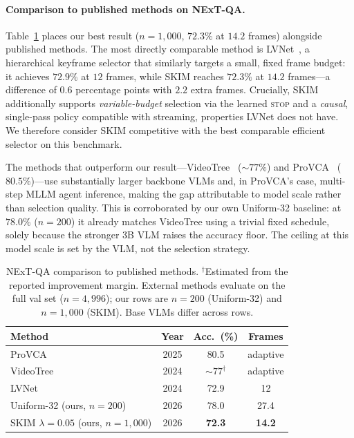 \documentclass{article}
\begin{document}
\paragraph{Comparison to published methods on NExT-QA.}
Table~\ref{tab:sota} places our best result ($n{=}1{,}000$, $72.3\%$ at $14.2$ frames)
alongside published methods. The most directly comparable method is
LVNet~\citep{lvnet}, a hierarchical keyframe selector that similarly targets a small,
fixed frame budget: it achieves $72.9\%$ at $12$ frames, while SKIM reaches $72.3\%$
at $14.2$ frames---a difference of $0.6$ percentage points with $2.2$ extra frames.
Crucially, SKIM additionally supports \emph{variable-budget} selection via the learned
\textsc{stop} and a \emph{causal}, single-pass policy compatible with streaming,
properties LVNet does not have. We therefore consider SKIM competitive with the best
comparable efficient selector on this benchmark.

The methods that outperform our result---VideoTree~\citep{videotree} (${\sim}77\%$) and
ProVCA~\citep{provca} ($80.5\%$)---use substantially larger backbone VLMs and, in
ProVCA's case, multi-step MLLM agent inference, making the gap attributable to
model scale rather than selection quality. This is corroborated by our own Uniform-32
baseline: at $78.0\%$ ($n{=}200$) it already matches VideoTree using a trivial fixed
schedule, solely because the stronger 3B VLM raises the accuracy floor. The ceiling
at this model scale is set by the VLM, not the selection strategy.

\begin{table}[h]
  \caption{NExT-QA comparison to published methods. $^\dagger$Estimated from the
    reported improvement margin. External methods evaluate on the full val set
    ($n{=}4{,}996$); our rows are $n{=}200$ (Uniform-32) and $n{=}1{,}000$ (SKIM).
    Base VLMs differ across rows.}
  \label{tab:sota}
  \centering
  \small
  \begin{tabular}{lccc}
    \toprule
    Method & Year & Acc.\ (\%) & Frames \\
    \midrule
    ProVCA~\citep{provca}       & 2025 & 80.5              & adaptive \\
    VideoTree~\citep{videotree} & 2024 & ${\sim}77^\dagger$ & adaptive \\
    LVNet~\citep{lvnet}         & 2024 & 72.9              & 12 \\
    \midrule
    Uniform-32 (ours, $n{=}200$)                         & 2026 & 78.0          & 27.4 \\
    SKIM $\lambda{=}0.05$ (ours, $n{=}1{,}000$)         & 2026 & \textbf{72.3} & \textbf{14.2} \\
    \bottomrule
  \end{tabular}
\end{table}
\end{document}

